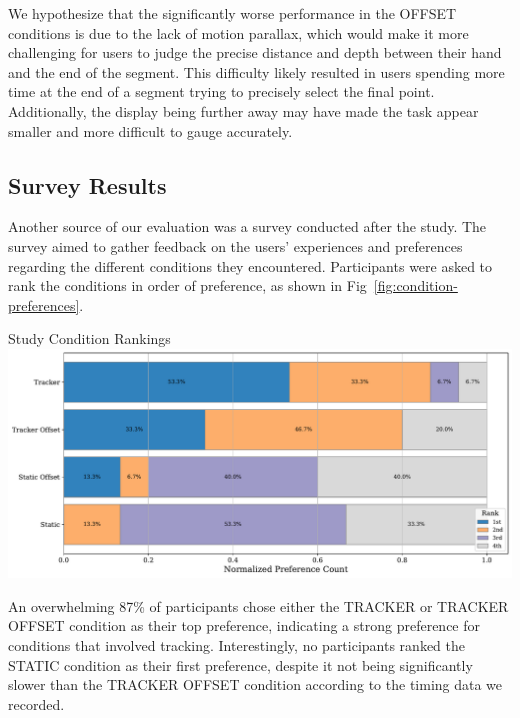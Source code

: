 We hypothesize that the significantly worse performance in the OFFSET conditions is due to the lack of motion parallax, which would make it more challenging for users to judge the precise distance and depth between their hand and the end of the segment. This difficulty likely resulted in users spending more time at the end of a segment trying to precisely select the final point. Additionally, the display being further away may have made the task appear smaller and more difficult to gauge accurately. \\

\subsection{Survey Results}

Another source of our evaluation was a survey conducted after the study. The survey aimed to gather feedback on the users' experiences and preferences regarding the different conditions they encountered. Participants were asked to rank the conditions in order of preference, as shown in Fig~\ref{fig:condition-preferences}. \\

\begin{figureBox}[label={fig:condition-preferences}, width=1.0\linewidth]{Study Condition Rankings}
    \includegraphics[width = 1.0\linewidth]{./evaluation/figures/survery/preferences.pdf}
\end{figureBox}

An overwhelming 87\% of participants chose either the TRACKER or TRACKER OFFSET condition as their top preference, indicating a strong preference for conditions that involved tracking. Interestingly, no participants ranked the STATIC condition as their first preference, despite it not being significantly slower than the TRACKER OFFSET condition according to the timing data we recorded. \\

